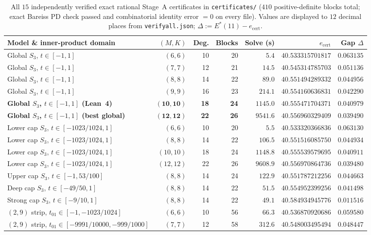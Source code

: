 \documentclass[11pt,reqno]{amsart}
\renewcommand{\_}{\origunderscore\allowbreak}
\theoremstyle{definition}
\begin{document}
\begin{table}[htbp]
  \centering
  \caption{All $15$ independently verified exact rational Stage~A certificates in \texttt{certificates/} ($410$ positive-definite blocks total; exact Bareiss PD check passed and combinatorial identity error $= 0$ on every file). Values are displayed to $12$ decimal places from \texttt{verify\_all.json}; $\Delta := E^*(11) - e_{\mathrm{cert}}$.}
  \label{tab:certs}
  \footnotesize
  \renewcommand{\arraystretch}{1.08}
  \begin{tabular}{@{}lrrrrrr@{}}
    \toprule
    Model \& inner-product domain & $(M,K)$ & Deg. & Blocks & Solve (s) & $e_{\mathrm{cert}}$ & Gap $\Delta$ \\
    \midrule
    Global $S_3$, $t \in [-1, 1]$ & $(6,6)$ & 10 & 20 & $5.4$ & $40.533315701817$ & $0.063135$ \\
    Global $S_3$, $t \in [-1, 1]$ & $(7,7)$ & 12 & 21 & $14.5$ & $40.545314785703$ & $0.051136$ \\
    Global $S_3$, $t \in [-1, 1]$ & $(8,8)$ & 14 & 22 & $89.0$ & $40.551494289332$ & $0.044956$ \\
    Global $S_3$, $t \in [-1, 1]$ & $(9,9)$ & 16 & 23 & $214.1$ & $40.554160636831$ & $0.042290$ \\
    \textbf{Global $S_3$, $t \in [-1, 1]$ (Lean~4)} & $\mathbf{(10,10)}$ & \textbf{18} & \textbf{24} & $\mathbf{1145.0}$ & $\mathbf{40.555471704371}$ & $\mathbf{0.040979}$ \\
    \textbf{Global $S_3$, $t \in [-1, 1]$ (best global)} & $\mathbf{(12,12)}$ & \textbf{22} & \textbf{26} & $\mathbf{9541.6}$ & $\mathbf{40.556960329409}$ & $\mathbf{0.039490}$ \\
    \midrule
    Lower cap $S_3$, $t \in [-1023/1024, 1]$ & $(6,6)$ & 10 & 20 & $5.5$ & $40.533320366836$ & $0.063130$ \\
    Lower cap $S_3$, $t \in [-1023/1024, 1]$ & $(8,8)$ & 14 & 22 & $106.5$ & $40.551516085750$ & $0.044934$ \\
    Lower cap $S_3$, $t \in [-1023/1024, 1]$ & $(10,10)$ & 18 & 24 & $1148.8$ & $40.555539579695$ & $0.040911$ \\
    Lower cap $S_3$, $t \in [-1023/1024, 1]$ & $(12,12)$ & 22 & 26 & $9608.9$ & $40.556970864736$ & $0.039480$ \\
    Upper cap $S_3$, $t \in [-1, 53/100]$ & $(8,8)$ & 14 & 24 & $122.9$ & $40.551787212256$ & $0.044663$ \\
    Deep cap $S_3$, $t \in [-49/50, 1]$ & $(8,8)$ & 14 & 22 & $51.5$ & $40.554952399256$ & $0.041498$ \\
    Strong cap $S_3$, $t \in [-9/10, 1]$ & $(8,8)$ & 14 & 22 & $49.1$ & $40.584934945776$ & $0.011516$ \\
    \midrule
    $(2,9)$ strip, $t_{01} \in [-1, -1023/1024]$ & $(6,6)$ & 10 & 56 & $66.3$ & $40.536870920686$ & $0.059580$ \\
    $(2,9)$ strip, $t_{01} \in [-9991/10000, -999/1000]$ & $(7,7)$ & 12 & 58 & $312.6$ & $40.548003495494$ & $0.048447$ \\
    \bottomrule
  \end{tabular}
\end{table}
\end{document}
